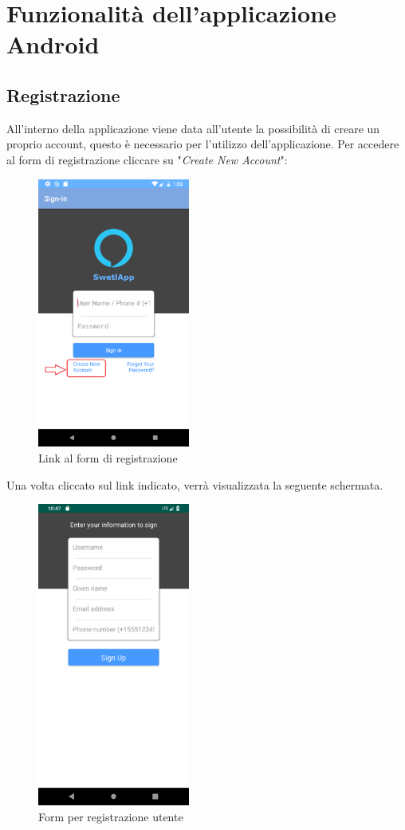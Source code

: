 \clearpage
\section{Funzionalità dell'applicazione  Android}
\label{sec:sec_funzionalita_applicazione}
\subsection{Registrazione}
\label{sec:funzionalita_applicazione_registrazione}
All'interno della applicazione viene data all'utente la possibilità di creare un proprio account, questo è necessario per l'utilizzo dell'applicazione. Per accedere al form di registrazione cliccare su "\textit{Create New Account}":
\begin{figure}[H]
	\centering
	\includegraphics[width=5cm]{../includes/pics/app_registration_form_1.png}
	\caption{\label{fig:app_registration_form_1}Link al form di registrazione}
\end{figure}
Una volta cliccato sul link indicato, verrà visualizzata la seguente schermata.
\begin{figure}[H]
	\centering
	\includegraphics[width=5cm]{../includes/pics/app_registration_form.png}
	\caption{\label{fig:app_registration_form}Form per registrazione utente}
\end{figure}
